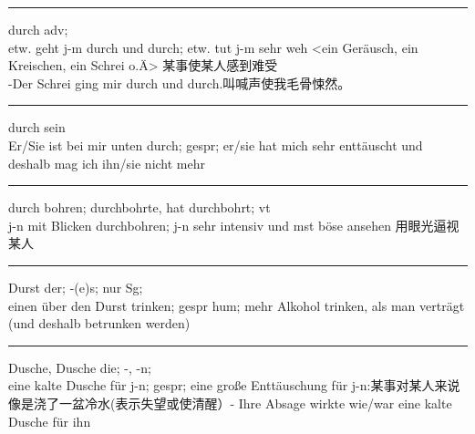 \noindent\rule{\textwidth}{1pt}
durch adv;\\
etw. geht j-m durch und durch; etw. tut j-m sehr weh <ein Ger\"ausch, ein Kreischen, ein Schrei o.\"A> 某事使某人感到难受\\
-Der Schrei ging mir durch und durch.叫喊声使我毛骨悚然。

\noindent\rule{\textwidth}{1pt}
durch sein \\
Er/Sie ist bei mir unten durch; gespr; er/sie hat mich sehr entt\"auscht und deshalb mag ich ihn/sie nicht mehr \\

\noindent\rule{\textwidth}{1pt}
durch bohren; durchbohrte, hat durchbohrt; vt\\
j-n mit Blicken durchbohren; j-n sehr intensiv und mst b\"ose ansehen 用眼光逼视某人\\

\noindent\rule{\textwidth}{1pt}
Durst der; -(e)s; nur Sg; \\
einen \"uber den Durst trinken; gespr hum; mehr Alkohol trinken, als man vertr\"agt (und deshalb betrunken werden)

\noindent\rule{\textwidth}{1pt}
Dusche, Dusche die; -, -n; \\
eine kalte Dusche f\"ur j-n; gespr; eine gro\ss{}e Entt\"auschung f\"ur j-n:某事对某人来说像是浇了一盆冷水(表示失望或使清醒）- Ihre Absage wirkte wie/war eine kalte Dusche f\"ur ihn 





